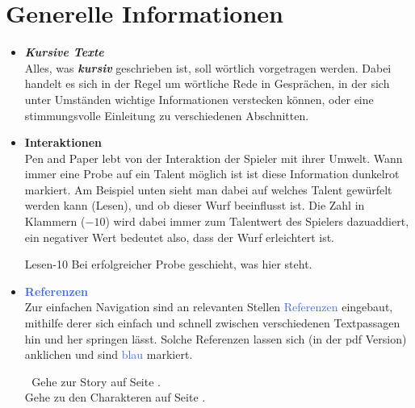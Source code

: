 \thispagestyle{fancy-info}
\section*{Generelle Informationen}

\begin{itemize}
  \item \textbf{\textit{Kursive Texte}} \\
  Alles, was \textbf{\textit{kursiv}} geschrieben ist, soll wörtlich vorgetragen werden. Dabei handelt es sich in der Regel
  um wörtliche Rede in Gesprächen, in der sich unter Umständen wichtige Informationen verstecken können, oder eine
  stimmungsvolle Einleitung zu verschiedenen Abschnitten.


  \item \textcolor{RoyalRed}{\textbf{Interaktionen}} \\
  Pen and Paper lebt von der \textcolor{RoyalRed}{Interaktion} der Spieler mit ihrer Umwelt. Wann immer eine Probe auf ein Talent
  möglich ist ist diese Information \textcolor{RoyalRed}{dunkelrot} markiert. Am Beispiel unten sieht man dabei auf welches Talent
  gewürfelt werden kann (Lesen), und ob dieser Wurf beeinflusst ist. Die Zahl in Klammern ($-10$) wird dabei immer zum Talentwert
  des Spielers dazuaddiert, ein negativer Wert bedeutet also, dass der Wurf erleichtert ist.

  \begin{probe}{Lesen}{-10}
  Bei erfolgreicher Probe geschieht, was hier steht.
  \end{probe}
  \vspace{-5pt}

  \item \textcolor{RoyalBlue}{\textbf{Referenzen}} \\
  Zur einfachen Navigation sind an relevanten Stellen \textcolor{RoyalBlue}{Referenzen} eingebaut, mithilfe derer sich einfach und
  schnell zwischen verschiedenen Textpassagen hin und her springen lässt. Solche Referenzen lassen sich (in der pdf
  Version) anklichen und sind \textcolor{RoyalBlue}{blau} markiert.

  \vspace{-5pt}
  \begin{refbox}{\chaptername$\;$\thechapter}
      Gehe zur Story auf Seite \textcolor{RoyalBlue}{\pageref{adv-start}}. \\
      Gehe zu den Charakteren auf Seite \textcolor{RoyalBlue}{\pageref{char-start}}.
  \end{refbox}
  \vspace{-5pt}


\end{itemize}
